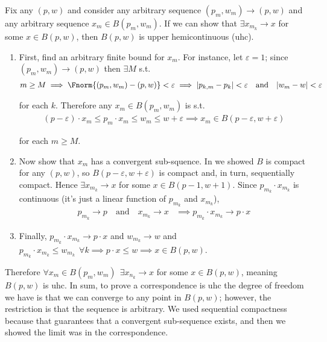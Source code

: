 \documentclass{article}
\begin{document}
Fix any $(p, w)$ and consider any arbitrary sequence $(p_m, w_m) \to (p, w)$ and any arbitrary sequence $x_m \in B(p_m, w_m)$. If we can show that $\exists x_{m_k} \to x$ for some $x \in B(p, w)$, then $B(p, w)$ is upper hemicontinuous (uhc).
\begin{enumerate}[1.]
  \item First, find an arbitrary finite bound for $x_m$.  For instance, let $\varepsilon = 1$; since $(p_m, w_m) \to (p, w)$ then $\exists M$ s.t.
    \begin{align*}
      m \ge M
      \implies
      \Fnorm{(p_m, w_m) - (p, w)}
      <
      \varepsilon
      \implies
      |p_{k, m} - p_k| < \varepsilon
      \quad
      \text{and}
      \quad
      |w_m - w| < \varepsilon
    \end{align*}

    for each $k$. Therefore any $x_m \in B(p_m, w_m)$ is s.t.
    \begin{align*}
      (p - \varepsilon) \cdot x_m
      \le
      p_m \cdot x_m
      \le
      w_m
      \le
      w + \varepsilon
      \implies
      x_m \in B(p - \varepsilon, w + \varepsilon)
    \end{align*}

    for each $m \ge M$.

  \item Now show that $x_m$ has a convergent sub-squence. In  we showed $B$ is compact for any $(p, w)$, so $B(p - \varepsilon, w + \varepsilon)$ is compact and, in turn, sequentially compact. Hence $\exists x_{m_k} \to x$ for some $x \in B(p - 1, w + 1)$. Since $p_{m_k} \cdot x_{m_k}$ is continuous (it's just a linear function of $p_{m_k}$ and $x_{m_k}$),
    \begin{align*}
      p_{m_k} \to p
      \quad
      \text{and}
      \quad
      x_{m_k} \to x
      &
      \implies
      p_{m_k} \cdot x_{m_k}
      \to
      p \cdot x
    \end{align*}

  \item Finally,
    $
    p_{m_k} \cdot x_{m_k}
    \to
    p \cdot x
    $
    and
    $
    w_{m_k}
    \to w
    $
    and
    $
    p_{m_k} \cdot x_{m_k}
    \le
    w_{m_k}
    ~~
    \forall k
    \implies
    p \cdot x \le w
    \implies
    x \in B(p, w)
    $.
\end{enumerate}

Therefore $\forall x_m \in B(p_m, w_m) ~~ \exists x_{n_k} \to x$ for some $x \in B(p, w)$, meaning $B(p, w)$ is uhc.  In sum, to prove a correspondence is uhc the degree of freedom we have is that we can converge to any point in $B(p, w)$; however, the restriction is that the sequence is arbitrary. We used sequential compactness because that guarantees that a convergent sub-sequence exists, and then we showed the limit was in the correspondence.
\end{document}
